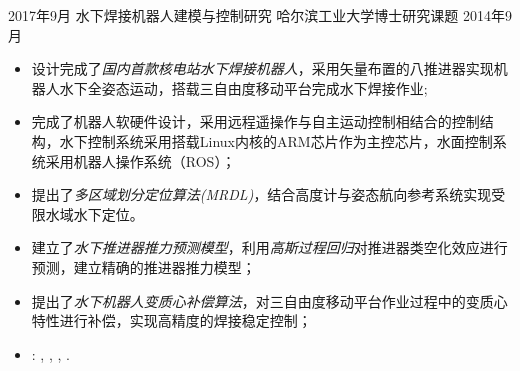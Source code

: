 %
%


 
\begin{experiences}
			
 \experience
    {2017年9月} {水下焊接机器人建模与控制研究}{ 哈尔滨工业大学}{博士研究课题}
{2014年9月} {
          \begin{itemize}
          	\item 设计完成了\emph{国内首款核电站水下焊接机器人}，采用矢量布置的八推进器实现机器人水下全姿态运动，搭载三自由度移动平台完成水下焊接作业;
            \item 完成了机器人软硬件设计，采用远程遥操作与自主运动控制相结合的控制结构，水下控制系统采用搭载Linux内核的ARM芯片作为主控芯片，水面控制系统采用机器人操作系统（ROS）；
            \item 提出了\emph{多区域划分定位算法(MRDL)}，结合高度计与姿态航向参考系统实现受限水域水下定位。
            \item 建立了\emph{水下推进器推力预测模型}，利用\emph{高斯过程回归}对推进器类空化效应进行预测，建立精确的推进器推力模型；
            \item 提出了\emph{水下机器人变质心补偿算法}，对三自由度移动平台作业过程中的变质心特性进行补偿，实现高精度的焊接稳定控制；
            \item \faGithub: 
            , 
            ,
            ,
            . 
                

\end{itemize}}
\end{experiences}
